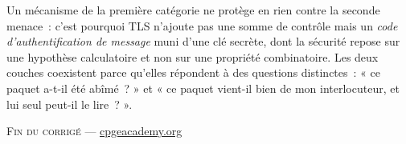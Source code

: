 \documentclass[11pt,a4paper]{article}
\begin{document}
Un mécanisme de la première catégorie ne protège en rien contre la seconde menace~: c'est
pourquoi TLS n'ajoute pas une somme de contrôle mais un \emph{code d'authentification de
message} muni d'une clé secrète, dont la sécurité repose sur une hypothèse calculatoire et
non sur une propriété combinatoire. Les deux couches coexistent parce qu'elles répondent à
des questions distinctes~: « ce paquet a-t-il été abîmé~? » et « ce paquet vient-il bien de
mon interlocuteur, et lui seul peut-il le lire~? ».

\vfill
\begin{center}\small\textsc{Fin du corrigé} \quad---\quad
\href{https://cpgeacademy.org}{cpgeacademy.org}\end{center}
\end{document}
